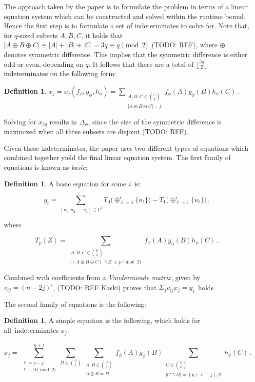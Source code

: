 \documentclass[a4paper,11pt]{report}
\theoremstyle{plain}
\theoremstyle{definition}
\newtheorem{defn}[thm]{Definition} %
\begin{document}
The approach taken by the paper is to formulate the problem in terms of a linear equation system which can be constructed and solved within the runtime bound.
Hence the first step is to formulate a set of indeterminates to solve for.
Note that, for $q$-sized subsets $A,B,C$, it holds that $|A\oplus B\oplus C|\equiv |A|+|B|+|C|=3q\equiv q\pmod 2\,$ (TODO: REF), where $\oplus$ denotes symmetric difference.
This implies that the symmetric difference is either odd or even, depending on $q$.
It follows that there are a total of $\lfloor \frac{3q}{2} \rfloor$ indeterminates on the following form:

\begin{defn}
$x_j=x_j(f_\phi,g_\phi,h_\phi)=\sum_{\substack{A,B,C\in\binom{U}{q}\\|A\oplus B\oplus C|=j}}
f_{\phi}(A)g_{\phi}(B)h_{\phi}(C)\,.$
\end{defn}

Solving for $x_{3q}$ results in $\Delta_\phi$, since the size of the symmetric difference is maximized when all three subsets are disjoint (TODO: REF). 

Given these indeterminates, the paper uses two different types of equations which combined together yield the final linear equation system.
The first family of equations is known as \emph{basic}:

\begin{defn}
A basic equation for some $i$ is:

\begin{equation}
\label{eq:yi}
y_i=
\sum_{(u_1,u_2,\ldots,u_i)\in U^i}
T_0\bigl(\oplus_{\ell=1}^i\{u_\ell\}\bigr)
-T_1\bigl(\oplus_{\ell=1}^i\{u_\ell\}\bigr)\,.
\end{equation}

where

\begin{equation}
T_p(Z)=
\sum_{\substack{A,B,C\in\binom{U}{q}\\|(A\oplus B\oplus C)\cap Z|\equiv p\!\!\!\pmod 2}}
f_\phi(A)g_\phi(B)h_\phi(C)\,.
\end{equation}
\end{defn}

Combined with coefficients from a \emph{Vandermonde matrix}, given by $v_{ij} = (n - 2j)^i$, (TODO: REF Kaski) proves that $\Sigma_j v_{ij}x_{j} = y_i$ holds.

The second family of equations is the following:

\begin{defn}
A simple equation is the following, which holds for all indeterminates $x_j$:

\begin{equation}
\label{eq:xj-direct}
x_j
=
\sum_{\substack{\ell=q-j\\\ell\equiv 0\!\!\!\!\!\pmod 2}}^{q+j}
\sum_{D\in\binom{U}{\ell}}
\sum_{\substack{A,B\in\binom{U}{q}\\A\oplus B=D}}
f_\phi(A)g_\phi(B)
\sum_{\substack{C\in\binom{U}{q}\\|C\cap D|=(q+\ell-j)/2}}h_\phi(C)\,.
\end{equation}

\end{defn}
\end{document}
